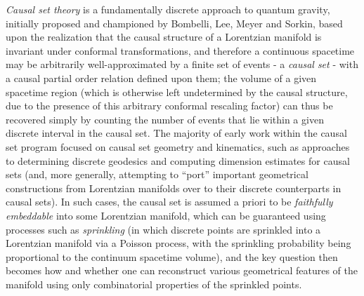 \documentclass{article}
\begin{document}
\textit{Causal set theory} is a fundamentally discrete approach to quantum gravity, initially proposed and championed by Bombelli, Lee, Meyer and Sorkin\cite{bombelli}\cite{bombelli2}, based upon the realization that the causal structure of a Lorentzian manifold is invariant under conformal transformations\cite{sorkin}\cite{sorkin2}\cite{hawking}\cite{malament}, and therefore a continuous spacetime may be arbitrarily well-approximated by a finite set of events - a \textit{causal set} - with a causal partial order relation defined upon them; the volume of a given spacetime region (which is otherwise left undetermined by the causal structure, due to the presence of this arbitrary conformal rescaling factor) can thus be recovered simply by counting the number of events that lie within a given discrete interval in the causal set. The majority of early work within the causal set program focused on causal set geometry and kinematics, such as approaches to determining discrete geodesics\cite{brightwell} and computing dimension estimates\cite{myrheim} for causal sets (and, more generally, attempting to ``port'' important geometrical constructions from Lorentzian manifolds over to their discrete counterparts in causal sets). In such cases, the causal set is assumed a priori to be \textit{faithfully embeddable}\cite{bombelli3}\cite{noldus}\cite{noldus2} into some Lorentzian manifold, which can be guaranteed using processes such as \textit{sprinkling} (in which discrete points are sprinkled into a Lorentzian manifold via a Poisson process, with the sprinkling probability being proportional to the continuum spacetime volume), and the key question then becomes how and whether one can reconstruct various geometrical features of the manifold using only combinatorial properties of the sprinkled points.
\end{document}
